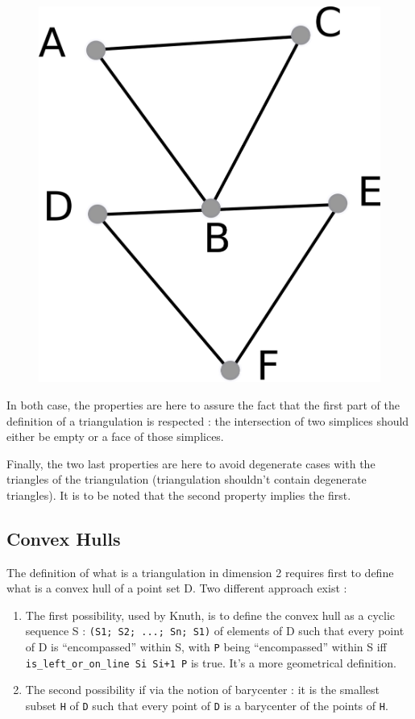 \documentclass[a4paper,10pt]{article}
\begin{document}
\begin{enumerate}
\begin{figure}[h]
\includegraphics[scale=2]{nps}\\
\end{figure}
\end{enumerate}
In both case, the properties are here to assure the fact that the first part of the definition of a triangulation is respected : the intersection of two simplices should either be empty or a face of those simplices.

Finally, the two last properties are here to avoid degenerate cases with the triangles of the triangulation (triangulation shouldn't contain degenerate triangles). It is to be noted that the second property implies the first.

\subsection{Convex Hulls}

The definition of what is a triangulation in dimension 2 requires first to define what is a convex hull of a point set D.
Two different approach exist :
\begin{enumerate}
\item The first possibility, used by Knuth,  is to define the convex hull as a cyclic sequence S : {\tt (S1; S2; ...; Sn; S1)} of elements of D such that every point of D is ``encompassed'' within S, with {\tt P} being ``encompassed'' within S iff {\tt is\_left\_or\_on\_line Si Si+1 P} is true.
  It's a more geometrical definition.
\item The second possibility if via the notion of barycenter : it is the smallest subset {\tt H} of {\tt D} such that every point of {\tt D} is a barycenter of the points of {\tt H}.
\end{enumerate}
\end{document}
